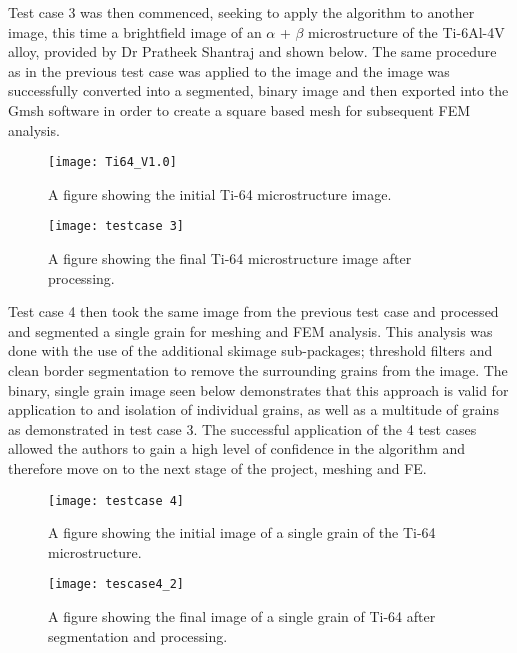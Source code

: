 \documentclass[\report.tex]{subfiles}
\begin{document}
\noindent Test case 3 was then commenced, seeking to apply the algorithm to another image, this time a brightfield image of an $\alpha$ + $\beta$ microstructure of the Ti-6Al-4V alloy, provided by Dr Pratheek Shantraj and shown below. The same procedure as in the previous test case was applied to the image and the image was successfully converted into a segmented, binary image and then exported into the Gmsh software in order to create a square based mesh for subsequent FEM analysis.

\begin{figure}
\centering
\parbox{6cm}{
\texttt{[image: Ti64\_V1.0]}
\caption{A figure showing the initial Ti-64 microstructure image.}
\label{fig:2figsA}}
\qquad
\begin{minipage}{7cm}
\texttt{[image: testcase 3]}
\caption{A figure showing the final Ti-64 microstructure image after processing.}
\label{fig:2figsB}
\end{minipage}
\end{figure}

\noindent Test case 4 then took the same image from the previous test case and processed and segmented a single grain for meshing and FEM analysis. This analysis was done with the use of the additional skimage sub-packages; threshold filters and clean border segmentation to remove the surrounding grains from the image. The binary, single grain image seen below demonstrates that this approach is valid for application to and isolation of individual grains, as well as a multitude of grains as demonstrated in test case 3. The successful application of the 4 test cases allowed the authors to gain a high level of confidence in the algorithm and therefore move on to the next stage of the project, meshing and FE.

\begin{figure}
\centering
\parbox{5cm}{
\texttt{[image: testcase 4]}
\caption{A figure showing the initial image of a single grain of the Ti-64 microstructure.}
\label{fig:2figsA}}
\qquad
\begin{minipage}{6cm}
\texttt{[image: tescase4\_2]}
\caption{A figure showing the final image of a single grain of Ti-64 after segmentation and processing.}
\label{fig:2figsB}
\end{minipage}
\end{figure}
\end{document}
